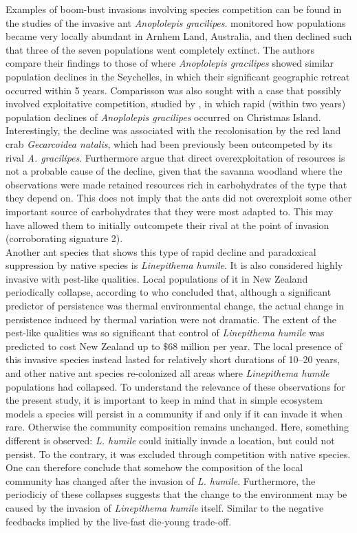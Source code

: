 \documentclass[a4paper]{report}
\begin{document}
Examples of boom-bust invasions involving species competition can be found in the studies of the invasive ant \textit{Anoplolepis gracilipes}. \citep{Hoffmann2015} monitored how populations became very locally abundant in Arnhem Land, Australia, and then declined such that three of the seven populations went completely extinct. The authors compare their findings to those of \citep{Hill2003} where \textit{Anoplolepis gracilipes} showed similar population declines in the Seychelles, in which their significant geographic retreat occurred within 5 years. Comparisson was also sought with a case that possibly involved exploitative competition, studied by \citep{Abbott2014}, in which rapid (within two years) population declines of  \textit{Anoplolepis gracilipes} occurred on Christmas Island. Interestingly, the decline was associated with the recolonisation by the red land crab \textit{Gecarcoidea natalis}, which had been previously been outcompeted by its rival \textit{A. gracilipes}. Furthermore \citep{Hoffmann2015} argue that direct overexploitation of resources is not a probable cause of the decline, given that the savanna woodland where the observations were made retained resources rich in carbohydrates of the type that they depend on. This does not imply that the ants did not overexploit some other important source of carbohydrates that they were most adapted to. This may have allowed them to initially outcompete their rival at the point of invasion (corroborating signature 2).\\

Another ant species that shows this type of rapid decline and paradoxical suppression by native species is \textit{Linepithema humile}. It is also considered highly invasive with pest-like qualities. Local populations of it in New Zealand periodically collapse, according to \citep{Cooling2012} who concluded that, although a significant predictor of persistence was thermal environmental change, the actual change in persistence induced by thermal variation were not dramatic. The extent of the pest-like qualities was so significant that control of \textit{Linepithema humile} was predicted to cost New Zealand up to $\$$68 million per year. The local presence of this invasive species instead lasted for relatively short durations of 10–20 years, and other native ant species re-colonized all areas where \textit{Linepithema humile} populations had collapsed. To understand the relevance of these observations for the present study, it is important to keep in mind that in simple ecosystem models a species will persist in a community if and only if it can invade it when rare. Otherwise the community composition remains unchanged. Here, something different is observed: \textit{L. humile} could initially invade a location, but could not persist. To the contrary, it was excluded through competition with native species. One can therefore conclude that somehow the composition of the local community has changed after the invasion of \textit{L. humile}. Furthermore, the periodiciy of these collapses suggests that the change to the environment may be caused by the invasion of \textit{Linepithema humile} itself. Similar to the negative feedbacks implied by the live-fast die-young trade-off.\\
\end{document}
